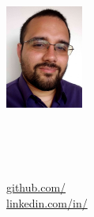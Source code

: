 


\begin{minipage}{1.1in}
  \centering \includegraphics[width=1in]{photo}
\end{minipage}
\begin{minipage}{\dimexpr(\textwidth-1.2in)}
  \begin{minipage}{.6\linewidth}
    \centering
    {\Huge\skills\name} \\
    {\color{highlight}\Large{\role}} \vspace{2em}
  \end{minipage}
  \begin{minipage}{.4\linewidth}
    \raggedleft
    \begin{small}
      \faHome\enspace\address\\
      \faEnvelope\enspace\href{mailto:\email}{\email} \\
      \faLanguage\enspace\languages\\
      \faGithub\enspace\href{https://github.com/\github}{github.com/\github} \\
      \faLinkedin\enspace\href{https://www.linkedin.com/in/\LinkedIn}{linkedin.com/in/\LinkedIn}
    \end{small}
  \end{minipage}
  \enskip{}
  {\color{highlight}\hrulefill}
  
\end{minipage}
